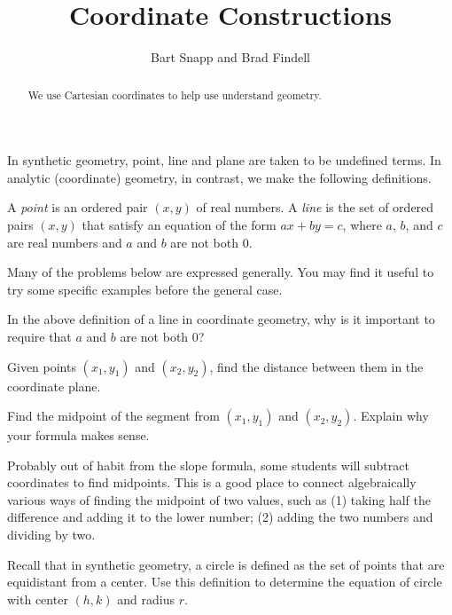 \documentclass[nooutcomes]{ximera}
\title{Coordinate Constructions}
\author{Bart Snapp and Brad Findell}
\begin{document}
\begin{abstract}
  We use Cartesian coordinates to help use understand geometry.
\end{abstract}
\maketitle

In synthetic geometry, point, line and plane are taken to be undefined terms.  In analytic (coordinate) geometry, in contrast, we make the following definitions.  
\begin{definition}
A \emph{point} is an ordered pair $(x,y)$ of real numbers. A \emph{line} is the set of ordered pairs $(x,y)$ that satisfy an equation of the form $ax + by = c$, where $a$, $b$, and $c$ are real numbers and $a$ and $b$ are not both 0.   
\end{definition}

Many of the problems below are expressed generally.  You may find it useful to try some specific examples before the general case.  


\begin{problem}
In the above definition of a line in coordinate geometry, why is it important to require that $a$ and $b$ are not both 0?  
\end{problem}

\begin{problem}
Given points $(x_1, y_1)$ and $(x_2, y_2)$, find the distance between them in the coordinate plane.
\end{problem}

\begin{problem}
Find the midpoint of the segment from $(x_1, y_1)$ and $(x_2, y_2)$.  Explain why your formula makes sense. 
\end{problem}

\begin{teachingnote}
Probably out of habit from the slope formula, some students will subtract coordinates to find midpoints.  This is a good place to connect algebraically various ways of finding the midpoint of two values, such as (1) taking half the difference and adding it to the lower number; (2) adding the two numbers and dividing by two. 
\end{teachingnote}   

\begin{problem}
Recall that in synthetic geometry, a circle is defined as the set of points that are equidistant from a center.  Use this definition to determine the equation of circle with center $(h, k)$ and radius $r$.%
\end{problem}
\end{document}
